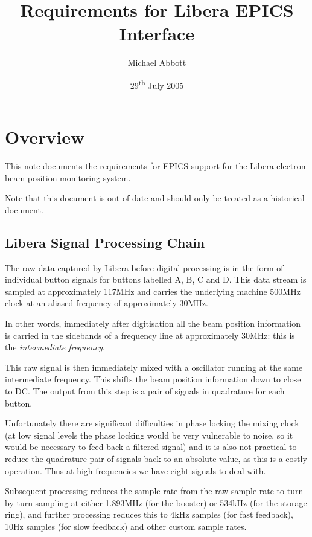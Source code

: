 \documentclass[
    a4paper,
    fleqn
]{article}
\begin{document}
\title{Requirements for Libera EPICS Interface}
\author{Michael Abbott}
\date{29\textsuperscript{th} July 2005}
\maketitle

\section{Overview}

This note documents the requirements for EPICS support for the Libera
electron beam position monitoring system.  

Note that this document is out of date and should only be treated as a
historical document.

\subsection{Libera Signal Processing Chain}

The raw data captured by Libera before digital processing is in the
form of individual button signals for buttons labelled A, B, C and D.
This data stream is sampled at approximately 117MHz and carries the
underlying machine 500MHz clock at an aliased frequency of
approximately 30MHz.

In other words, immediately after digitisation all the beam position
information is carried in the sidebands of a frequency line at
approximately 30MHz: this is the \emph{intermediate frequency}.

This raw signal is then immediately mixed with a oscillator running at
the same intermediate frequency.  This shifts the beam position
information down to close to DC.  The output from this step is a pair
of signals in quadrature for each button.

Unfortunately there are significant difficulties in phase locking the
mixing clock (at low signal levels the phase locking would be very
vulnerable to noise, so it would be necessary to feed back a filtered
signal) and it is also not practical to reduce the quadrature pair of
signals back to an absolute value, as this is a costly operation.
Thus at high frequencies we have eight signals to deal with.

Subsequent processing reduces the sample rate from the raw sample rate
to turn-by-turn sampling at either 1.893MHz (for the booster) or
534kHz (for the storage ring), and further processing reduces this to
4kHz samples (for fast feedback), 10Hz samples (for slow feedback) and
other custom sample rates.
\end{document}
